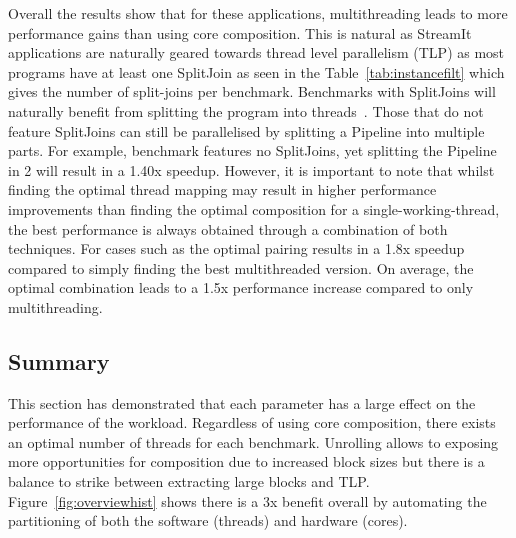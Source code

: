 Overall the results show that for these applications, multithreading leads to more performance gains than using core composition.
This is natural as StreamIt applications are naturally geared towards thread level parallelism (TLP) as most programs have at least one SplitJoin as seen in the Table~\ref{tab:instancefilt} which gives the number of split-joins per benchmark.
Benchmarks with SplitJoins will naturally benefit from splitting the program into threads~\cite{thiesStreamit2010}.
Those that do not feature SplitJoins can still be parallelised by splitting a Pipeline into multiple parts.
For example, benchmark  features no SplitJoins, yet splitting the Pipeline in 2 will result in a 1.40x speedup.
However, it is important to note that whilst finding the optimal thread mapping may result in higher performance improvements than finding the optimal composition for a single-working-thread, the best performance is always obtained through a combination of both techniques.
For cases such as  the optimal pairing results in a 1.8x speedup compared to simply finding the best multithreaded version.
On average, the optimal combination leads to a 1.5x performance increase compared to only multithreading.

\subsection{Summary}
This section has demonstrated that each parameter has a large effect on the performance of the workload.
Regardless of using core composition, there exists an optimal number of threads for each benchmark.
Unrolling allows to exposing more opportunities for composition due to increased block sizes but there is a balance to strike between extracting large blocks and TLP.
Figure~\ref{fig:overviewhist} shows there is a 3x benefit overall by automating the partitioning of both the software (threads) and hardware (cores).

